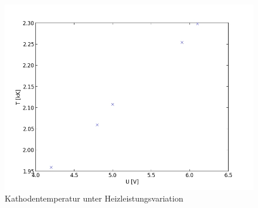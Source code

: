 	\begin{figure}[h]
		\begin{center}
		\includegraphics[scale=0.75]{picd1.jpg}
		\caption{Kathodentemperatur unter Heizleistungsvariation}
		\label{picd1}
		\end{center}	
	\end{figure}